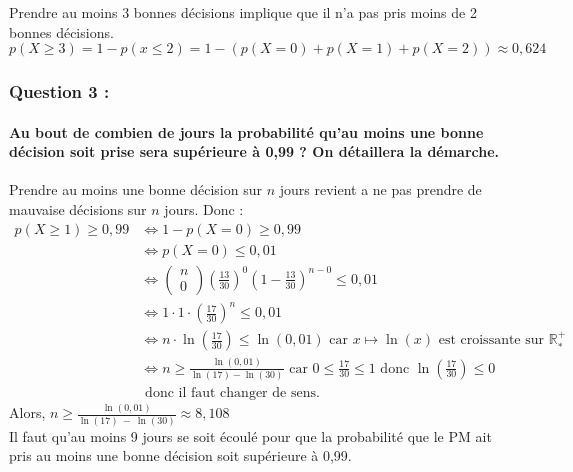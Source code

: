 \documentclass[a4paper, 12pt]{article}
\begin{document}
Prendre au moins 3 bonnes décisions implique que il n'a pas pris moins de 2 bonnes décisions.\\
$p(X \geq 3) = 1 - p(x \leq 2) = 1- \left( p(X=0) + p(X = 1) + p(X = 2)\right) \approx 0,624$

{}
\subsubsection*{Question 3 :}
\paragraph*{Au bout de combien de jours la probabilité qu'au moins une bonne décision soit prise sera supérieure à 0,99 ? On détaillera la démarche.\\[5mm]}

Prendre au moins une bonne décision sur $n$ jours revient a ne pas prendre de mauvaise décisions sur $n$ jours. Donc : \\
$\begin{aligned}
p(X \geq 1) \geq 0,99 &\Leftrightarrow 1 - p(X = 0) \geq 0,99 \\
&\Leftrightarrow p(X = 0) \leq 0,01 \\
&\Leftrightarrow \begin{pmatrix} n \\ 0 \end{pmatrix} \left( \frac{13}{30}\right)^0 \left(1 - \frac{13}{30}\right)^{n-0} \leq 0,01 \\
&\Leftrightarrow 1 \cdot 1 \cdot \left(\frac{17}{30} \right)^n \leq 0,01 \\
&\Leftrightarrow n \cdot \ln{\left( \frac{17}{30} \right) } \leq \ln{\left(0,01\right)} \text{ car } x \mapsto \ln{\left(x\right)} \text{ est croissante sur } \mathds{R}^+_*\\
&\Leftrightarrow n  \geq \frac{\ln{\left(0,01\right)}}{\ln{\left(17\right)}-\ln{\left(30\right)}} \text{ car } 0 \leq \frac{17}{30} \leq 1 
    \text{ donc } \ln{\left(\frac{17}{30}\right)} \leq 0 \\
& \text{ donc il faut changer de sens.}
\end{aligned}$
\\[2mm]
Alors, $n \geq \frac{\ln{\left(0,01\right)}}{\ln{\left(17\right)}\ -\ \ln{\left(30\right)}} \approx 8,108 $
\\
Il faut qu'au moins 9 jours se soit écoulé pour que la probabilité que le PM ait pris au moins une bonne décision soit supérieure à 0,99.
\end{document}
